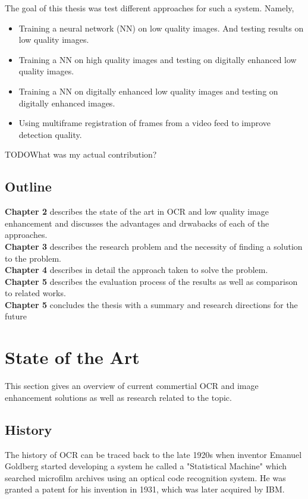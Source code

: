 \documentclass[12pt]{article}
\begin{document}
The goal of this thesis was test different approaches for such a system. Namely,
\begin{itemize}
  \item Training a neural network (NN) on low quality images. And testing results on low quality images.
  \item Training a NN on high quality images and testing on digitally enhanced low quality images.
  \item Training a NN on digitally enhanced low quality images and testing on digitally enhanced images.
  \item Using multiframe registration of frames from a video feed to improve detection quality.
\end{itemize}

TODO{What was my actual contribution?}

\subsection{Outline}
\textbf{Chapter 2} describes the state of the art in OCR and low quality image enhancement and discusses the advantages and drwabacks of each of the approaches.\\
\textbf{Chapter 3} describes the research problem and the necessity of finding a solution to the problem.\\
\textbf{Chapter 4} describes in detail the approach taken to solve the problem.\\
\textbf{Chapter 5} describes the evaluation process of the results as well as comparison to related works.\\
\textbf{Chapter 5} concludes the thesis with a summary and research directions for the future

\newpage
\section{State of the Art} 

This section gives an overview of current commertial OCR and image enhancement solutions as well as research related to the topic.

\subsection{History}

The history of OCR can be traced back to the late 1920s when inventor Emanuel Goldberg started developing a system he called a "Statistical Machine" which searched microfilm archives using an optical code recognition system. He was granted a patent for his invention in 1931, which was later acquired by IBM. ~\cite{1838389}
\end{document}
